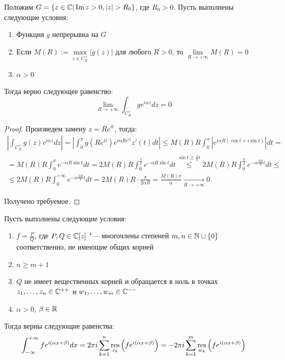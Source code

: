 \begin{proposition}
    Положим $G = \{z \in \mathbb{C} | \operatorname{Im} z > 0, |z| > R_0\}$, где $R_0 > 0$.
	Пусть выполнены следующие условия:
	\begin{enumerate}
		\item Функция $g$ непрерывна на $G$
		\item Если $M(R) := \max\limits_{z \in C_R^+}|g(z)|$ для любого $R>0$, то $\lim\limits_{R \to +\infty}M(R) = 0$
		\item $\alpha > 0$
	\end{enumerate}
	
	Тогда верно следующее равенство:
	\[\lim_{R \to +\infty} \int_{C_R^+}ge^{i\alpha z}dz = 0\]
\end{proposition}

\begin{proof}
	Произведем замену $z = Re^{it}$, тогда:
	\begin{multline*}
		\left|\int_{C_R^+}g(z)e^{i\alpha z}dz\right| = \left|\int_0^\pi g(Re^{it})e^{i\alpha Re^{it}}z'(t)dt\right| \le M(R)R \int_0^\pi \left|e^{i\alpha R(\cos{t} + i\sin{t})}\right|dt = \\
		= M(R)R \int_0^\pi e^{-\alpha R\sin{t}}dt = 2M(R)R \int_0^{\frac\pi 2} e^{-\alpha R\sin{t}}dt  \stackrel{\sin t \ge \frac 2 \pi t}{\le} 2M(R)R \int_0^{\frac\pi 2} e^{-\alpha \frac{2R}\pi t}dt \le \\
		\le 2M(R)R \int_0^{+\infty} e^{-\alpha \frac{2R}\pi t}dt = 2M(R)R \cdot \frac\pi{2\alpha R} = \frac{M(R)\pi}{\alpha} \xrightarrow[R \to +\infty]{} 0
	\end{multline*}
	
	Получено требуемое.
\end{proof}

\begin{theorem}
	Пусть выполнены следующие условия:
	\begin{enumerate}
		\item $f = \frac PQ$, где $P, Q \in \mathbb{C}[z]$ "--- многочлены степеней $m, n \in \mathbb{N} \cup \{0\}$ соответственно, не имеющие общих корней
		\item $n \ge m + 1$
		\item $Q$ не имеет вещественных корней и обращается в ноль в точках $z_1, \dotsc, z_n \in \mathbb{C}^{++}$ и $w_1, \dotsc, w_m \in \mathbb{C}^{--}$
		\item $\alpha > 0$, $\beta \in \mathbb{R}$
	\end{enumerate}
	
	Тогда верны следующие равенства:
	\[\int_{-\infty}^{+\infty}fe^{i(\alpha x + \beta)}dx = 2\pi i\sum_{k=1}^n \operatorname*{res}_{z_k}\left(fe^{i(\alpha x + \beta)}\right) = -2\pi i\sum_{k=1}^m \operatorname*{res}_{w_k}\left(fe^{i(\alpha x + \beta)}\right)\]
\end{theorem}

